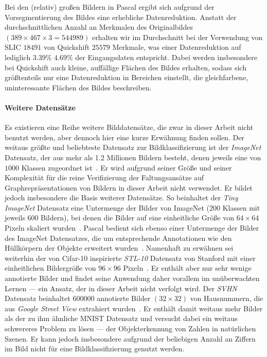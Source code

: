 Bei den (relativ) großen Bildern in \gls{Pascal} ergibt sich aufgrund der Vorsegmentierung des Bildes eine erhebliche Datenreduktion.
Anstatt der durchschnittlichen Anzahl an Merkmalen des Originalbildes $\left(389 \times 467 \times 3 = 544989\right)$ erhalten wir im Durchschnitt bei der Verwendung von \gls{SLIC} $18491$ \bzw{} von Quickshift $25579$ Merkmale, was einer Datenreduktion auf lediglich $3.39\%$ \bzw{} $4.69\%$ der Eingangsdaten entspricht.
Dabei werden insbesondere bei Quickshift auch kleine, auffällige Flächen des Bildes erhalten, sodass sich größtenteils nur eine Datenreduktion in Bereichen einstellt, die gleichfarbene, uninteressante Flächen des Bildes beschreiben.

\paragraph{Weitere Datensätze}
\label{weitere_datensaetze}

Es existieren eine Reihe weitere Bilddatensätze, die zwar in dieser Arbeit nicht benutzt werden, aber dennoch hier eine kurze Erwähnung finden sollen.
Der weitaus größte und beliebteste Datensatz zur Bildklassifizierung ist der \emph{ImageNet} Datensatz, der aus mehr als 1.2 Millionen Bildern besteht, denen jeweils eine von $1000$ Klassen zugeordnet ist~\cite{imagenet}.
Er wird aufgrund seiner Größe und seiner Komplexität für die reine Verifizierung der Faltungsansätze auf Graphrepräsentationen von Bildern in dieser Arbeit nicht verwendet.
Er bildet jedoch insbesondere die Basis weiterer Datensätze.
So beinhaltet \bspw{} der \emph{Tiny ImageNet} Datensatz eine Untermenge der Bilder von ImageNet (200 Klassen mit jeweils 600 Bildern), bei denen die Bilder auf eine einheitliche Größe von $64 \times 64$ Pixeln skaliert wurden~\cite{imagenet}.
\gls{Pascal} bedient sich ebenso einer Untermenge der Bilder des ImageNet Datensatzes, die um entsprechende Annotationen wie \zB{} den Hüllkörpern der Objekte erweitert wurden~\cite{pascal_voc}.
Namenhaft zu erwähnen sei weiterhin der von \gls{Cifar}-10 inspirierte \emph{STL-10} Datensatz von Stanford mit einer einheitlichen Bildergröße von $96 \times 96$ Pixeln~\cite{stl}.
Er enthält aber nur sehr wenige annotierte Bilder und findet seine Anwendung daher vorallem im unüberwachten Lernen — ein Ansatz, der in dieser Arbeit nicht verfolgt wird.
Der \emph{\gls{SVHN}} Datensatz beinhaltet 600000 annotierte Bilder $\left(32 \times 32\right)$ von Hausnummern, die aus \emph{Google Street View} extrahiert wurden~\cite{svhn}.
Er enthält damit weitaus mehr Bilder als der zu ihm ähnliche \gls{MNIST} Datensatz und versucht dabei ein weitaus schwereres Problem zu lösen — der Objekterkennung von Zahlen in natürlichen Szenen.
Er kann jedoch insbesondere aufgrund der beliebigen Anzahl an Ziffern im Bild nicht für eine Bildklassifizierung genutzt werden.

